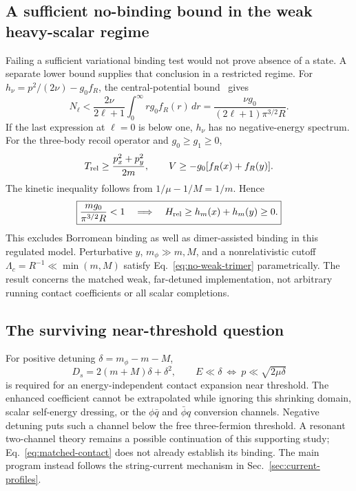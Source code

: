 \subsection{A sufficient no-binding bound in the weak heavy-scalar regime}
Failing a sufficient variational binding test would not prove absence of a state. A separate lower bound supplies that conclusion in a restricted regime. For $h_\nu=p^2/(2\nu)-g_0f_R$, the central-potential bound~\cite{Bargmann} gives
\begin{equation}
 N_\ell<\frac{2\nu}{2\ell+1}\int_0^\infty r g_0f_R(r)\,dr
 =\frac{\nu g_0}{(2\ell+1)\pi^{3/2}R}.
\end{equation}
If the last expression at $\ell=0$ is below one, $h_\nu$ has no negative-energy spectrum. For the three-body recoil operator and $g_0\geq g_1\geq0$,
\begin{equation}
 T_{\rm rel}\geq\frac{p_x^2+p_y^2}{2m},\qquad
 V\geq-g_0[f_R(x)+f_R(y)].
\end{equation}
The kinetic inequality follows from $1/\mu-1/M=1/m$. Hence
\begin{equation}
 \boxed{\frac{m g_0}{\pi^{3/2}R}<1
 \quad\Longrightarrow\quad H_{\rm rel}\geq h_m(x)+h_m(y)\geq0.}
 \label{eq:no-weak-trimer}
\end{equation}
This excludes Borromean binding as well as dimer-assisted binding in this regulated model. Perturbative $y$, $m_\phi\gg m,M$, and a nonrelativistic cutoff $\Lambda_c=R^{-1}\ll\min(m,M)$ satisfy Eq.~\eqref{eq:no-weak-trimer} parametrically. The result concerns the matched weak, far-detuned implementation, not arbitrary running contact coefficients or all scalar completions.

\subsection{The surviving near-threshold question}
For positive detuning $\delta=m_\phi-m-M$,
\begin{equation}
 D_s=2(m+M)\delta+\delta^2,\qquad
 E\ll\delta\ \Longleftrightarrow\ p\ll\sqrt{2\mu\delta}
\end{equation}
is required for an energy-independent contact expansion near threshold. The enhanced coefficient cannot be extrapolated while ignoring this shrinking domain, scalar self-energy dressing, or the $\phi\bar q$ and $\bar\phi q$ conversion channels. Negative detuning puts such a channel below the free three-fermion threshold. A resonant two-channel theory remains a possible continuation of this supporting study; Eq.~\eqref{eq:matched-contact} does not already establish its binding. The main program instead follows the string-current mechanism in Sec.~\ref{sec:current-profiles}.

